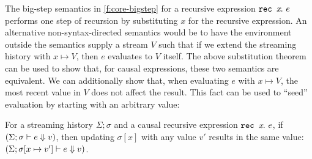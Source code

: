 The big-step semantics in \autoref{f:core-bigstep} for a recursive expression $\texttt{rec~} x\hspace{-0.1em}.~e$ performs one step of recursion by substituting $x$ for the recursive expression.
An alternative non-syntax-directed semantics would be to have the environment outside the semantics supply a stream $V$ such that if we extend the streaming history with $x \mapsto V$, then $e$ evaluates to $V$ itself.
The above substitution theorem can be used to show that, for causal expressions, these two semantics are equivalent.
We can additionally show that, when evaluating $e$ with $x \mapsto V$, the most recent value in $V$ does not affect the result.
This fact can be used to ``seed'' evaluation by starting with an arbitrary value:
\begin{theorem}
  For a streaming history $\Sigma; \sigma$ and a causal recursive expression $\texttt{rec~} x\hspace{-0.1em}.~e$, if $(\Sigma; \sigma \vdash e \Downarrow v)$, then updating $\sigma[x]$ with any value $v'$ results in the same value: $(\Sigma; \sigma[x \mapsto v'] \vdash e \Downarrow v)$.
\end{theorem}

